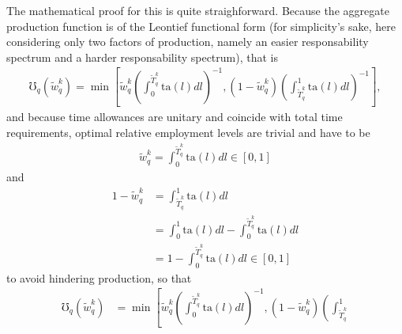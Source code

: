 \documentclass[hidelinks, nonatbib]{elsarticle}
\begin{document}
\begin{enumerate}
        The mathematical proof for this is quite straighforward. Because the aggregate production function is of the Leontief functional form (for simplicity's sake, here considering only two factors of production, namely an easier responsability spectrum and a harder responsability spectrum), that is
        \begin{gather}
            \mho_{q}(\tilde{w}_{q}^{k})
            = 
            \min\left[
                \tilde{w}_{q}^{k}
                \left(
                    \int_{0}^{\tilde{T}_{q}^{k}}{
                        \text{ta}(l)dl
                    }
                \right) ^ {-1}
                ,
                (1 - \tilde{w}_{q}^{k})
                \left(
                    \int_{\tilde{T}_{q}^{k}}^{1}{
                        \text{ta}(l)dl
                    }
                \right) ^ {-1}
            \right]
            ,
        \end{gather}
        and because time allowances are unitary and coincide with total time requirements, optimal relative employment levels are trivial and have to be
        \begin{gather}
            \tilde{w}_{q}^{k}
            =
            \int_{0}^{\tilde{T}_{q}^{k}}{
                \text{ta}(l)dl
            }
            \in [0,1]
        \end{gather}
        and
        \begin{align}
            1 - \tilde{w}_{q}^{k}
            &=
            \int_{\tilde{T}_{q}^{k}}^{1}{
                \text{ta}(l)dl
            }
            \\
            &=
            \int_{0}^{1}{
                \text{ta}(l)dl
            }
            -
            \int_{0}^{\tilde{T}_{q}^{k}}{
                \text{ta}(l)dl
            }
            \\
            &=
            1
            -
            \int_{0}^{\tilde{T}_{q}^{k}}{
                \text{ta}(l)dl
            }
            \in [0,1]
        \end{align}
        to avoid hindering production, so that
        \begin{align}
            \mho_{q}(\tilde{w}_{q}^{k})
            &= 
            \min\left[
                \tilde{w}_{q}^{k}
                \left(
                    \int_{0}^{\tilde{T}_{q}^{k}}{
                        \text{ta}(l)dl
                    }
                \right) ^ {-1}
                ,
                (1 - \tilde{w}_{q}^{k})
                \left(
                    \int_{\tilde{T}_{q}^{k}}^{1}{
}
\end{align}
\end{enumerate}
\end{document}
